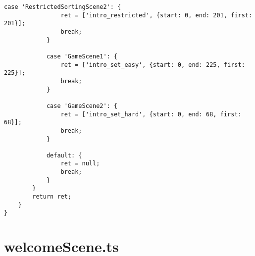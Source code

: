 \begin{lstlisting}[style=TypeScript, caption={introScene.ts}]
            case 'RestrictedSortingScene2': {
                ret = ['intro_restricted', {start: 0, end: 201, first: 201}];
                break;
            }

            case 'GameScene1': {
                ret = ['intro_set_easy', {start: 0, end: 225, first: 225}];
                break;
            }

            case 'GameScene2': {
                ret = ['intro_set_hard', {start: 0, end: 68, first: 68}];
                break;
            }

            default: {
                ret = null;
                break;
            }
        }
        return ret;
    }
}
\end{lstlisting}

\section{welcomeScene.ts}\label{sec:welcomescene.ts}

